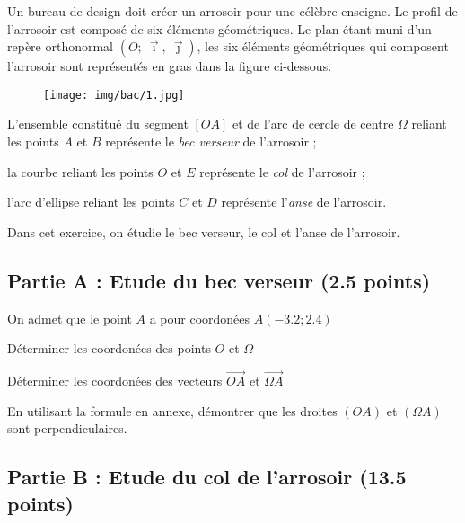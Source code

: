 \documentclass[answers]{exam}
\begin{document}
Un bureau de design doit créer un arrosoir pour une célèbre enseigne. Le profil de l'arrosoir est composé de six éléments géométriques. Le plan étant muni d'un repère orthonormal
$\left(O\mathpunct{} ; \ \overrightarrow{\imath}\mathpunct{},\ \overrightarrow{\jmath}\right)\mathpunct{}$, les six éléments géométriques qui composent l'arrosoir sont représentés en gras
dans la figure ci-dessous.

\begin{figure}[H]
  \centering
  \texttt{[image: img/bac/1.jpg]}
\end{figure}

\begin{compactitem}
  \item L'ensemble constitué du segment \([OA]\) et de l'arc de cercle de
        centre \(\Omega\) reliant les points \(A\) et \(B\) représente
        le \emph{bec verseur} de l'arrosoir ;
  \item la courbe reliant les points \(O\) et \(E\) représente le
        \emph{col} de l'arrosoir ;
  \item l'arc d'ellipse reliant les points \(C\) et \(D\) représente
        l'\emph{anse} de l'arrosoir.
\end{compactitem}

Dans cet exercice, on étudie le bec verseur, le col et l'anse de l'arrosoir.

\subsection*{Partie A : Etude du bec verseur (2.5 points)}

On admet que le point $A$ a pour coordonées $A(-3.2 ; 2.4)$

\begin{questions}
  \question[0.5] Déterminer les coordonées des points $O$ et $\Omega$ 
  
\question[1] Déterminer les coordonées des vecteurs $\overrightarrow{OA}$ et $\overrightarrow{\Omega A}$
  
\question[1] En utilisant la formule en annexe, démontrer que les droites $(OA)$ et $(\Omega A)$ sont perpendiculaires.
\end{questions}


\subsection*{Partie B : Etude du col de l'arrosoir (13.5 points)}
\end{document}
